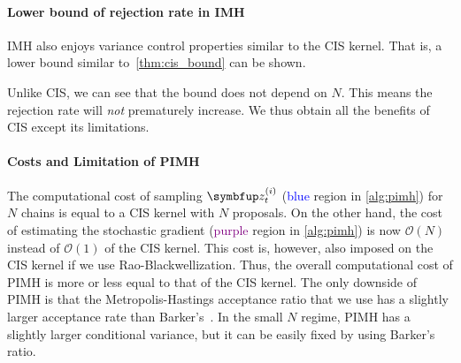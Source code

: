 \vspace{-0.1in}
\paragraph{Lower bound of rejection rate in IMH}
IMH also enjoys variance control properties similar to the CIS kernel.
That is, a lower bound similar to~\cref{thm:cis_bound} can be shown.
%

%
Unlike CIS, we can see that the bound does not depend on \(N\).
This means the rejection rate will \textit{not} prematurely increase.
We thus obtain all the benefits of CIS except its limitations.

\vspace{-0.1in}
\paragraph{Costs and Limitation of PIMH}
The computational cost of sampling \(\vz^{(i)}_{t}\) (\textcolor{blue}{blue} region in \cref{alg:pimh}) for \(N\) chains is equal to a CIS kernel with \(N\) proposals.
On the other hand, the cost of estimating the stochastic gradient (\textcolor{purple}{purple} region in \cref{alg:pimh}) is now \(\mathcal{O}(N)\) instead of \(\mathcal{O}(1)\) of the CIS kernel.
This cost is, however, also imposed on the CIS kernel if we use Rao-Blackwellization.
Thus, the overall computational cost of PIMH is more or less equal to that of the CIS kernel.
The only downside of PIMH is that the Metropolis-Hastings acceptance ratio that we use has a slightly larger acceptance rate than Barker's~\citep{peskun_optimum_1973, minh_understanding_2015}.
In the small \(N\) regime, PIMH has a slightly larger conditional variance, but it can be easily fixed by using Barker's ratio.

